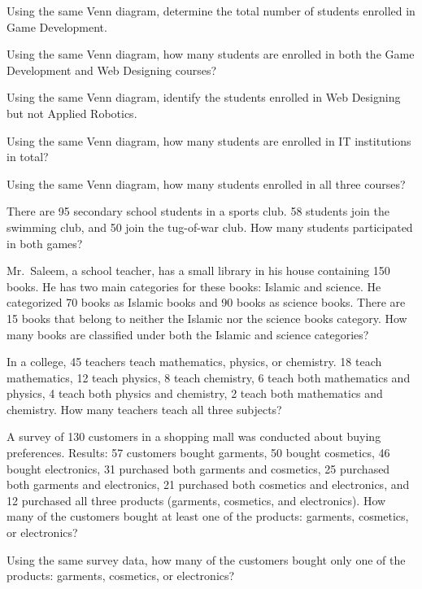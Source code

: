 \documentclass[11pt]{article}
\begin{document}
\begin{wq}[start=56]
\item Using the same Venn diagram, determine the total number of students enrolled in Game Development.

\item Using the same Venn diagram, how many students are enrolled in both the Game Development and Web Designing courses?

\item Using the same Venn diagram, identify the students enrolled in Web Designing but not Applied Robotics.

\item Using the same Venn diagram, how many students are enrolled in IT institutions in total?

\item Using the same Venn diagram, how many students enrolled in all three courses?

\item There are 95 secondary school students in a sports club. 58 students join the swimming club, and 50 join the tug-of-war club. How many students participated in both games?

\item Mr.\ Saleem, a school teacher, has a small library in his house containing 150 books. He has two main categories for these books: Islamic and science. He categorized 70 books as Islamic books and 90 books as science books. There are 15 books that belong to neither the Islamic nor the science books category. How many books are classified under both the Islamic and science categories?

\item In a college, 45 teachers teach mathematics, physics, or chemistry. 18 teach mathematics, 12 teach physics, 8 teach chemistry, 6 teach both mathematics and physics, 4 teach both physics and chemistry, 2 teach both mathematics and chemistry. How many teachers teach all three subjects?

\item A survey of 130 customers in a shopping mall was conducted about buying preferences. Results: 57 customers bought garments, 50 bought cosmetics, 46 bought electronics, 31 purchased both garments and cosmetics, 25 purchased both garments and electronics, 21 purchased both cosmetics and electronics, and 12 purchased all three products (garments, cosmetics, and electronics). How many of the customers bought at least one of the products: garments, cosmetics, or electronics?

\item Using the same survey data, how many of the customers bought only one of the products: garments, cosmetics, or electronics?


\end{wq}
\end{document}

